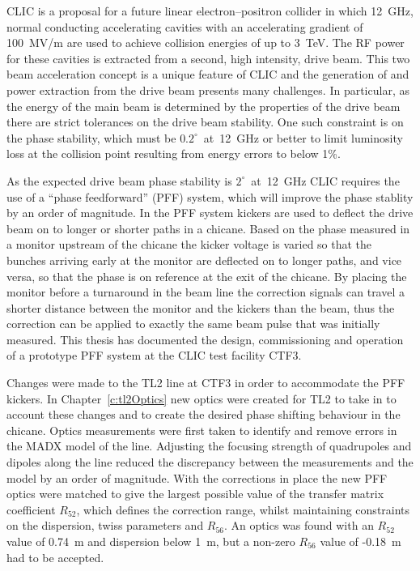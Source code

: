 

CLIC is a proposal for a future linear electron--positron collider in which 12~GHz, normal conducting accelerating cavities with an accelerating gradient of 100~MV/m are used to achieve collision energies of up to 3~TeV. The RF power for these cavities is extracted from a second, high intensity, drive beam. This two beam acceleration concept is a unique feature of CLIC and the generation of and power extraction from the drive beam presents many challenges. In particular, as the energy of the main beam is determined by the properties of the drive beam there are strict tolerances on the drive beam stability. One such constraint is on the phase stability, which must be \(0.2^\circ\)~at~12~GHz or better to limit luminosity loss at the collision point resulting from energy errors to below 1\%. 

As the expected drive beam phase stability is \(2^\circ\)~at~12~GHz CLIC requires the use of a ``phase feedforward'' (PFF) system, which will improve the phase stablity by an order of magnitude. In the PFF system kickers are used to deflect the drive beam on to longer or shorter paths in a chicane. Based on the phase measured in a monitor upstream of the chicane the kicker voltage is varied so that the bunches arriving early at the monitor are deflected on to longer paths, and vice versa, so that the phase is on reference at the exit of the chicane. By placing the monitor before a turnaround in the beam line the correction signals can travel a shorter distance between the monitor and the kickers than the beam, thus the correction can be applied to exactly the same beam pulse that was initially measured. This thesis has documented the design, commissioning and operation of a prototype PFF system at the CLIC test facility CTF3.

Changes were made to the TL2 line at CTF3 in order to accommodate the PFF kickers. In Chapter~\ref{c:tl2Optics} new optics were created for TL2 to take in to account these changes and to create the desired phase shifting behaviour in the chicane. Optics measurements were first taken to identify and remove errors in the MADX model of the line. Adjusting the focusing strength of quadrupoles and dipoles along the line reduced the discrepancy between the measurements and the model by an order of magnitude. With the corrections in place the new PFF optics were matched to give the largest possible value of the transfer matrix coefficient \(R_{52}\), which defines the correction range, whilst maintaining constraints on the dispersion, twiss parameters and \(R_{56}\). An optics was found with an \(R_{52}\) value of 0.74~m and dispersion below 1~m, but a non-zero \(R_{56}\) value of -0.18~m had to be accepted.

